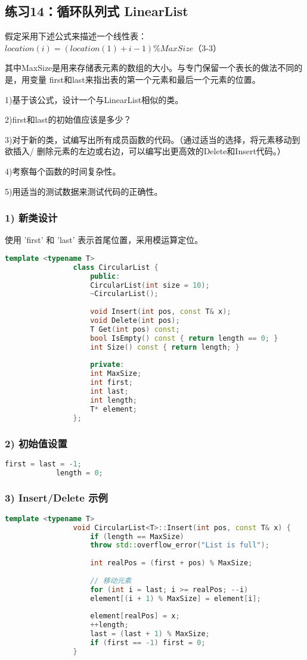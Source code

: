 \documentclass[UTF8]{ctexart}
\begin{document}
			\subsection{练习14：循环队列式 LinearList}
			假定采用下述公式来描述一个线性表：
			$location(i)=(location(1)+i-1)\%MaxSize$（3-3）
			
			其中MaxSize是用来存储表元素的数组的大小。与专门保留一个表长的做法不同的是，用变量
			first和last来指出表的第一个元素和最后一个元素的位置。
			
			1)基于该公式，设计一个与LinearList相似的类。
			
			2)first和last的初始值应该是多少？
			
			3)对于新的类，试编写出所有成员函数的代码。（通过适当的选择，将元素移动到欲插入/
			删除元素的左边或右边，可以编写出更高效的Delete和Insert代码。）
			
			4)考察每个函数的时间复杂性。
			
			5)用适当的测试数据来测试代码的正确性。
			
			\subsubsection{1) 新类设计}
			使用 'first' 和 'last' 表示首尾位置，采用模运算定位。
			\begin{lstlisting}[language=C++]
				template <typename T>
				class CircularList {
					public:
					CircularList(int size = 10);
					~CircularList();
					
					void Insert(int pos, const T& x);
					void Delete(int pos);
					T Get(int pos) const;
					bool IsEmpty() const { return length == 0; }
					int Size() const { return length; }
					
					private:
					int MaxSize;
					int first;
					int last;
					int length;
					T* element;
				};
			\end{lstlisting}
			\subsubsection{2) 初始值设置}
			\begin{lstlisting}[language=C++]
			first = last = -1;
			length = 0;
		\end{lstlisting}
			\subsubsection{3) Insert/Delete 示例}
			\begin{lstlisting}[language=C++]
				template <typename T>
				void CircularList<T>::Insert(int pos, const T& x) {
					if (length == MaxSize)
					throw std::overflow_error("List is full");
					
					int realPos = (first + pos) % MaxSize;
					
					// 移动元素
					for (int i = last; i >= realPos; --i)
					element[(i + 1) % MaxSize] = element[i];
					
					element[realPos] = x;
					++length;
					last = (last + 1) % MaxSize;
					if (first == -1) first = 0;
				}
			\end{lstlisting}
			
\end{document}
